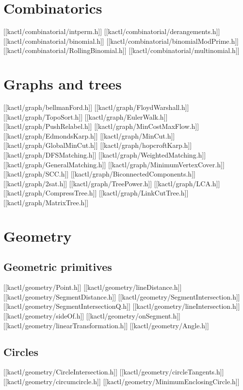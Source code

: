 \chapter{Combinatorics}

[[kactl/combinatorial/intperm.h]]
[[kactl/combinatorial/derangements.h]]
[[kactl/combinatorial/binomial.h]]
[[kactl/combinatorial/binomialModPrime.h]]
[[kactl/combinatorial/RollingBinomial.h]]
[[kactl/combinatorial/multinomial.h]]

\chapter{Graphs and trees}

[[kactl/graph/bellmanFord.h]]
[[kactl/graph/FloydWarshall.h]]
[[kactl/graph/TopoSort.h]]
[[kactl/graph/EulerWalk.h]]
[[kactl/graph/PushRelabel.h]]
[[kactl/graph/MinCostMaxFlow.h]]
[[kactl/graph/EdmondsKarp.h]]
[[kactl/graph/MinCut.h]]
[[kactl/graph/GlobalMinCut.h]]
[[kactl/graph/hopcroftKarp.h]]
[[kactl/graph/DFSMatching.h]]
[[kactl/graph/WeightedMatching.h]]
[[kactl/graph/GeneralMatching.h]]
[[kactl/graph/MinimumVertexCover.h]]
[[kactl/graph/SCC.h]]
[[kactl/graph/BiconnectedComponents.h]]
[[kactl/graph/2sat.h]]
[[kactl/graph/TreePower.h]]
[[kactl/graph/LCA.h]]
[[kactl/graph/CompressTree.h]]
[[kactl/graph/LinkCutTree.h]]
[[kactl/graph/MatrixTree.h]]

\chapter{Geometry}

\section{Geometric primitives}

[[kactl/geometry/Point.h]]
[[kactl/geometry/lineDistance.h]]
[[kactl/geometry/SegmentDistance.h]]
[[kactl/geometry/SegmentIntersection.h]]
[[kactl/geometry/SegmentIntersectionQ.h]]
[[kactl/geometry/lineIntersection.h]]
[[kactl/geometry/sideOf.h]]
[[kactl/geometry/onSegment.h]]
[[kactl/geometry/linearTransformation.h]]
[[kactl/geometry/Angle.h]]

\section{Circles}

[[kactl/geometry/CircleIntersection.h]]
[[kactl/geometry/circleTangents.h]]
[[kactl/geometry/circumcircle.h]]
[[kactl/geometry/MinimumEnclosingCircle.h]]


